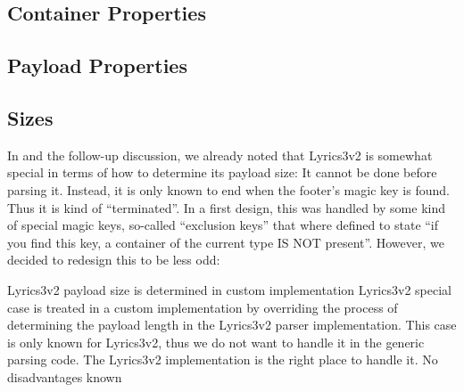\subsection{Container Properties}%
\label{sec:ContainerProperties}%


\subsection{Payload Properties}%
\label{sec:PayloadProperties}%


\subsection{Sizes}%
\label{sec:Sizes}%

In  and the follow-up discussion, we already noted that Lyrics3v2 is somewhat special in terms of how to determine its payload size: It cannot be done before parsing it. Instead, it is only known to end when the footer's magic key is found. Thus it is kind of ``terminated''. In a first design, this was handled by some kind of special magic keys, so-called ``exclusion keys'' that where defined to state ``if you find this key, a container of the current type IS NOT present''. However, we decided to redesign this to be less odd:

{%
Lyrics3v2 payload size is determined in custom implementation
}
{%
Lyrics3v2 special case is treated in a custom implementation by overriding the process of determining the payload length in the Lyrics3v2 parser implementation.
}
{%
This case is only known for Lyrics3v2, thus we do not want to handle it in the generic parsing code. The Lyrics3v2 implementation is the right place to handle it.
}
{%
No disadvantages known
}












%
%
